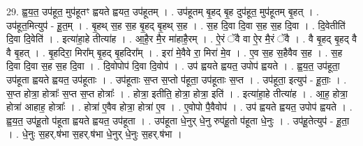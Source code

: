 \documentclass[17pt]{extarticle}
\begin{document}
29. ह्व॒य॒त॒ उप॑हूत॒ मुप॑हूतꣳ ह्वयते ह्वयत॒ उप॑हूतम् । . उप॑हूतम् बृ॒हद् बृ॒ह दुप॑हूत॒ मुप॑हूतम् बृ॒हत् । . उप॑हूत॒मित्युप॑ - हू॒त॒म् । . बृ॒हथ् स॒ह स॒ह बृ॒हद् बृ॒हथ् स॒ह । . स॒ह दि॒वा दि॒वा स॒ह स॒ह दि॒वा । . दि॒वेतीति॑ दि॒वा दि॒वेति॑ । . इत्या॑हा॒हे तीत्या॑ह । . आ॒है॒र मै॒र मा॑हाहै॒रम् । . ऐ॒रं ॅवै वा ऐ॒र मै॒रं ॅवै । . वै बृ॒हद् बृ॒हद् वै वै बृ॒हत् । . बृ॒हदिरा॒ मिरा᳚म् बृ॒हद् बृ॒हदिरा᳚म् । . इरा॑ मे॒वैवे रा॒ मिरा॑ मे॒व । . ए॒व स॒ह स॒हैवैव स॒ह । . स॒ह दि॒वा दि॒वा स॒ह स॒ह दि॒वा । . दि॒वोपोप॑ दि॒वा दि॒वोप॑ । . उप॑ ह्वयते ह्वयत॒ उपोप॑ ह्वयते । . ह्व॒य॒त॒ उप॑हूता॒ उप॑हूता ह्वयते ह्वयत॒ उप॑हूताः । . उप॑हूताः स॒प्त स॒प्तो प॑हूता॒ उप॑हूताः स॒प्त । . उप॑हूता॒ इत्युप॑ - हू॒ताः॒ । . स॒प्त होत्रा॒ होत्राः᳚ स॒प्त स॒प्त होत्राः᳚ । . होत्रा॒ इतीति॒ होत्रा॒ होत्रा॒ इति॑ । . इत्या॑हा॒हे तीत्या॑ह । . आ॒ह॒ होत्रा॒ होत्रा॑ आहाह॒ होत्राः᳚ । . होत्रा॑ ए॒वैव होत्रा॒ होत्रा॑ ए॒व । . ए॒वोपो पै॒वैवोप॑ । . उप॑ ह्वयते ह्वयत॒ उपोप॑ ह्वयते । . ह्व॒य॒त॒ उप॑हू॒तो प॑हूता ह्वयते ह्वयत॒ उप॑हूता । . उप॑हूता धे॒नुर् धे॒नु रुप॑हू॒तो प॑हूता धे॒नुः । . उप॑हू॒तेत्युप॑ - हू॒ता॒ । . धे॒नुः स॒हर्.ष॑भा स॒हर्.ष॑भा धे॒नुर् धे॒नुः स॒हर्.ष॑भा । \newline
\end{document}
